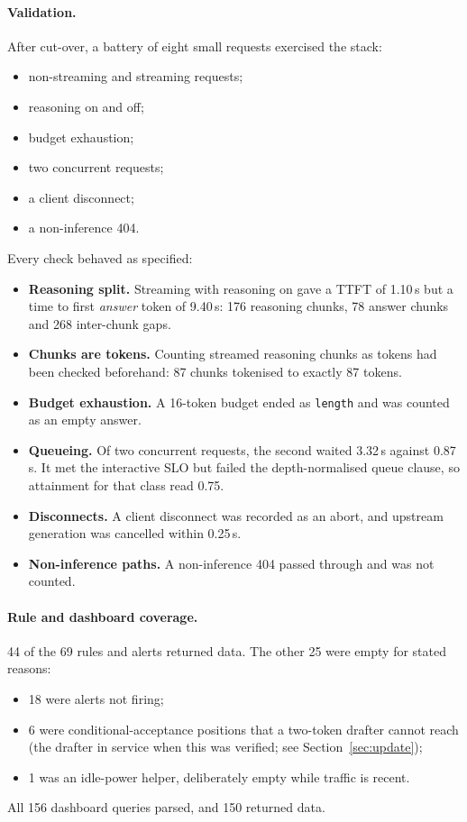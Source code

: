 \documentclass[11pt]{article}
\begin{document}
\paragraph{Validation.} After cut-over, a battery of eight small requests exercised the stack:
\begin{itemize}
\item non-streaming and streaming requests;
\item reasoning on and off;
\item budget exhaustion;
\item two concurrent requests;
\item a client disconnect;
\item a non-inference 404.
\end{itemize}
Every check behaved as specified:
\begin{itemize}
\item \textbf{Reasoning split.} Streaming with reasoning on gave a TTFT of 1.10\,s but a time to first
\emph{answer} token of 9.40\,s: 176 reasoning chunks, 78 answer chunks and 268 inter-chunk gaps.
\item \textbf{Chunks are tokens.} Counting streamed reasoning chunks as tokens had been checked
beforehand: 87 chunks tokenised to exactly 87 tokens.
\item \textbf{Budget exhaustion.} A 16-token budget ended as \texttt{length} and was counted as an empty
answer.
\item \textbf{Queueing.} Of two concurrent requests, the second waited 3.32\,s against 0.87\,s. It met
the interactive SLO but failed the depth-normalised queue clause, so attainment for that class read
0.75.
\item \textbf{Disconnects.} A client disconnect was recorded as an abort, and upstream generation was
cancelled within 0.25\,s.
\item \textbf{Non-inference paths.} A non-inference 404 passed through and was not counted.
\end{itemize}

\paragraph{Rule and dashboard coverage.} 44 of the 69 rules and alerts returned data. The other 25
were empty for stated reasons:
\begin{itemize}
\item 18 were alerts not firing;
\item 6 were conditional-acceptance positions that a two-token drafter cannot reach (the drafter in service when this was verified; see Section~\ref{sec:update});
\item 1 was an idle-power helper, deliberately empty while traffic is recent.
\end{itemize}
All 156 dashboard queries parsed, and 150 returned data.
\end{document}
